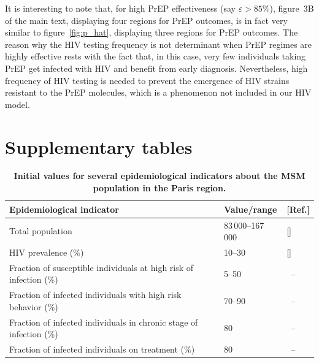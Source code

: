 \documentclass[11pt]{article}
\begin{document}
It is interesting to note that, for high PrEP effectiveness (say $\varepsilon>85\%$), figure~3B of the main text, displaying four regions for PrEP outcomes, is in fact very similar to figure~\ref{fig:p_hat}, displaying three regions for PrEP outcomes. The reason why the HIV testing frequency is not determinant when PrEP regimes are highly effective rests with the fact that, in this case, very few individuals taking PrEP get infected with HIV and benefit from early diagnosis. Nevertheless, high frequency of HIV testing is needed to prevent the emergence of HIV strains resistant to the PrEP molecules, which is a phenomenon not included in our HIV model.
 
\newpage
\section{Supplementary tables}

\begin{table}[H]
	\small
	\centering
	\caption[Initial values for several epidemiological indicators about the MSM population in the Paris region]{%
	    {\bf Initial values for several epidemiological indicators about the MSM population in the Paris region.}}
	\begin{tabular}{lll}
	\toprule
	\bf Epidemiological indicator 	& \bf Value/range 	& \bf [Ref.]\\
	\midrule
	Total population										& 83\,000--167\,000 	& [\citenum{Bajos2018,Insee2015}]\\
	HIV prevalence	 (\%)									& 10--30			& [\citenum{Prevagay2017}]\\
	Fraction of susceptible individuals at high risk of infection	(\%) 	& 5--50			& \, --\\
	Fraction of infected individuals with high risk behavior (\%)	& 70--90			& \, --\\
	Fraction of infected individuals in chronic stage of infection (\%)	& 80 				& \, --\\
	Fraction of infected individuals on treatment (\%)			& 80				& \, --\\
	\bottomrule
	\end{tabular}
	\label{tab:InitConds}
\end{table}

\vfill
\phantom{.}
\newpage
\end{document}
